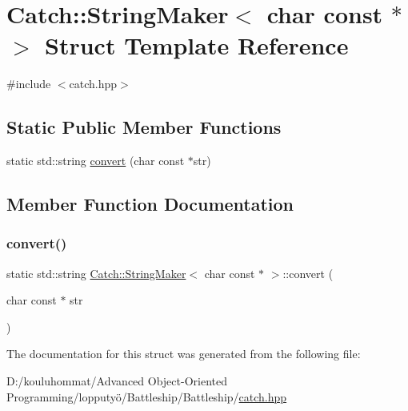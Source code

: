 \hypertarget{struct_catch_1_1_string_maker_3_01char_01const_01_5_01_4}{}\section{Catch\+:\+:String\+Maker$<$ char const $\ast$ $>$ Struct Template Reference}
\label{struct_catch_1_1_string_maker_3_01char_01const_01_5_01_4}


{\ttfamily \#include $<$catch.\+hpp$>$}

\subsection*{Static Public Member Functions}
\begin{DoxyCompactItemize}
\item 
static std\+::string \mbox{\hyperlink{struct_catch_1_1_string_maker_3_01char_01const_01_5_01_4_a20813965ad59cdf6d1f874f47158432d}{convert}} (char const $\ast$str)
\end{DoxyCompactItemize}


\subsection{Member Function Documentation}
\mbox{\label{struct_catch_1_1_string_maker_3_01char_01const_01_5_01_4_a20813965ad59cdf6d1f874f47158432d}} 
\subsubsection{\texorpdfstring{convert()}{convert()}}
{\footnotesize\ttfamily static std\+::string \mbox{\hyperlink{struct_catch_1_1_string_maker}{Catch\+::\+String\+Maker}}$<$ char const $\ast$ $>$\+::convert (\begin{DoxyParamCaption}\item[{char const $\ast$}]{str }\end{DoxyParamCaption})\hspace{0.3cm}{\ttfamily [static]}}



The documentation for this struct was generated from the following file\+:\begin{DoxyCompactItemize}
\item 
D\+:/kouluhommat/\+Advanced Object-\/\+Oriented Programming/lopputyö/\+Battleship/\+Battleship/\mbox{\hyperlink{catch_8hpp}{catch.\+hpp}}\end{DoxyCompactItemize}
